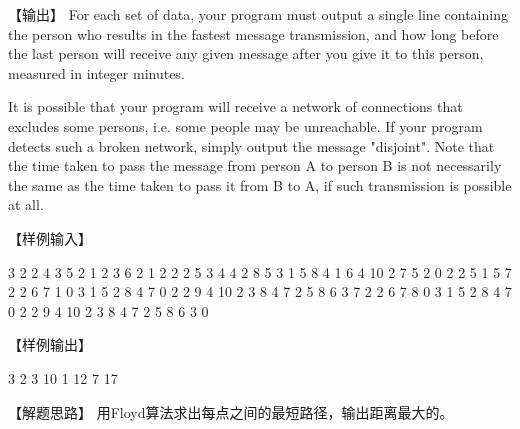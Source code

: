 【输出】
For each set of data, your program must output a single line containing the person who results in the fastest message transmission, and how long before the last person will receive any given message after you give it to this person, measured in integer minutes.

It is possible that your program will receive a network of connections that excludes some persons, i.e. some people may be unreachable. If your program detects such a broken network, simply output the message "disjoint". Note that the time taken to pass the message from person A to person B is not necessarily the same as the time taken to pass it from B to A, if such transmission is possible at all.

【样例输入】
\begin{Code}
    3
    2 2 4 3 5
    2 1 2 3 6
    2 1 2 2 2
    5
    3 4 4 2 8 5 3
    1 5 8
    4 1 6 4 10 2 7 5 2
    0
    2 2 5 1 5
    7
    2 2 6 7 1
    0
    3 1 5 2 8 4 7
    0
    2 2 9 4 10
    2 3 8 4 7
    2 5 8 6 3
    7
    2 2 6 7 8
    0
    3 1 5 2 8 4 7
    0
    2 2 9 4 10
    2 3 8 4 7
    2 5 8 6 3
    0
\end{Code}

【样例输出】
\begin{Code}
    3 2
    3 10
    1 12
    7 17
\end{Code}

【解题思路】
用Floyd算法求出每点之间的最短路径，输出距离最大的。


